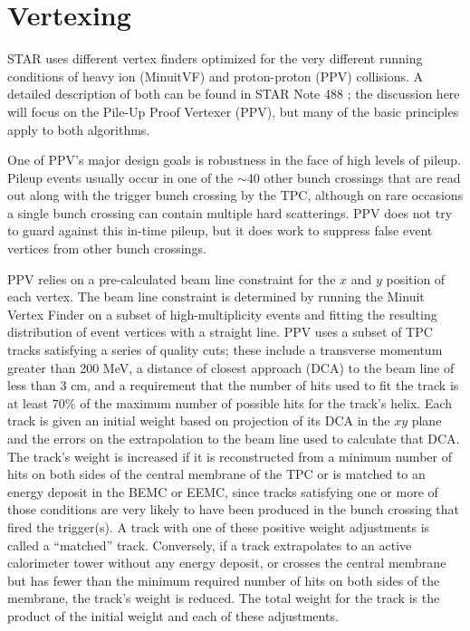 \section{Vertexing}

STAR uses different vertex finders optimized for the very different running
conditions of heavy ion (MinuitVF) and proton-proton (PPV) collisions. A
detailed description of both can be found in STAR Note 488
\cite{vertex-finder-starnote}; the discussion here will focus on the Pile-Up
Proof Vertexer (PPV), but many of the basic principles apply to both
algorithms.

One of PPV's major design goals is robustness in the face of high levels of
pileup. Pileup events usually occur in one of the $\sim$40 other bunch
crossings that are read out along with the trigger bunch crossing by the TPC,
although on rare occasions a single bunch crossing can contain multiple hard
scatterings. PPV does not try to guard against this in-time pileup, but it
does work to suppress false event vertices from other bunch crossings.

PPV relies on a pre-calculated beam line constraint for the $x$ and $y$
position of each vertex. The beam line constraint is determined by running the
Minuit Vertex Finder on a subset of high-multiplicity events and fitting the
resulting distribution of event vertices with a straight line. PPV uses a
subset of TPC tracks satisfying a series of quality cuts; these include a
transverse momentum greater than 200 MeV, a distance of closest approach (DCA)
to the beam line of less than 3 cm, and a requirement that the number of hits
used to fit the track is at least 70\% of the maximum number of possible hits
for the track's helix. Each track is given an initial weight based on
projection of its DCA in the $xy$ plane and the errors on the extrapolation to
the beam line used to calculate that DCA. The track's weight is increased if
it is reconstructed from a minimum number of hits on both sides of the central
membrane of the TPC or is matched to an energy deposit in the BEMC or EEMC,
since tracks satisfying one or more of those conditions are very likely to
have been produced in the bunch crossing that fired the trigger(s). A track
with one of these positive weight adjustments is called a ``matched'' track.
Conversely, if a track extrapolates to an active calorimeter tower without any
energy deposit, or crosses the central membrane but has fewer than the minimum
required number of hits on both sides of the membrane, the track's weight is
reduced. The total weight for the track is the product of the initial weight
and each of these adjustments.

